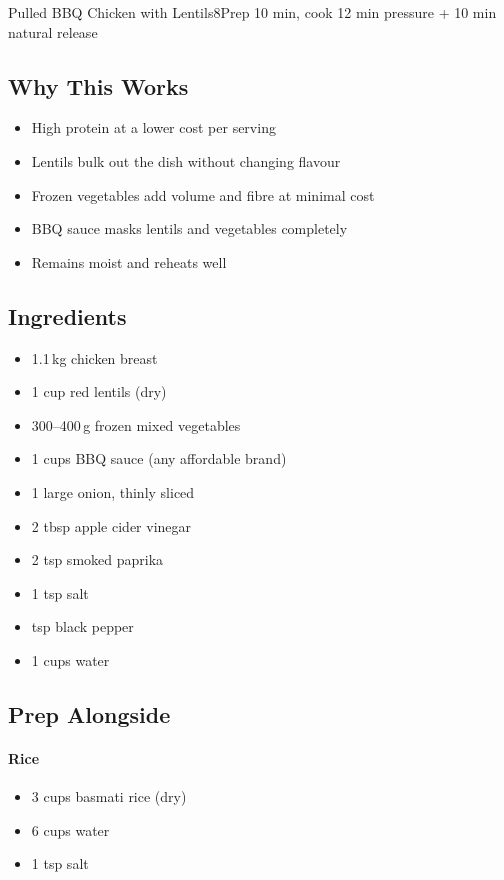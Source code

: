 \begin{recipebox}{Pulled BBQ Chicken with Lentils}{8}{Prep 10 min, cook 12 min pressure + 10 min natural release}
\subsection*{Why This Works}
\begin{itemize}
    \item High protein at a lower cost per serving
    \item Lentils bulk out the dish without changing flavour
    \item Frozen vegetables add volume and fibre at minimal cost
    \item BBQ sauce masks lentils and vegetables completely
    \item Remains moist and reheats well
\end{itemize}

\subsection*{Ingredients}
\begin{itemize}
    \item 1.1\,kg chicken breast
    \item 1 cup red lentils (dry)
    \item 300--400\,g frozen mixed vegetables
    \item 1 cups BBQ sauce (any affordable brand)
    \item 1 large onion, thinly sliced
    \item 2 tbsp apple cider vinegar
    \item 2 tsp smoked paprika
    \item 1 tsp salt
    \item {} tsp black pepper
    \item 1 cups water
\end{itemize}

\subsection*{Prep Alongside}

\paragraph{Rice}
\begin{itemize}
    \item 3 cups basmati rice (dry)
    \item 6 cups water
    \item 1 tsp salt
\end{itemize}


\end{recipebox}

